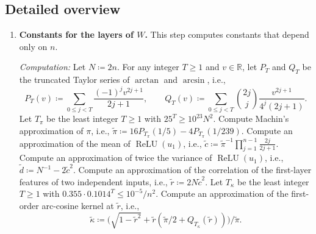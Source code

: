 \documentclass[10pt]{article}
\newcommand{\RR}{\mathbb{R}}
\newcommand{\relu}{\operatorname{ReLU}}
\begin{document}
\subsection{Detailed overview}
\begin{enumerate}[leftmargin=*,itemsep=8pt,topsep=10pt plus 2pt]
\item \textbf{Constants for the layers of $W$.} This step computes
  constants that depend only on $n$.

  \emph{Computation:} Let $N\coloneqq 2n$. For any integer $T\ge1$ and
  $v\in\RR$, let $P_T$ and $Q_T$ be the truncated Taylor series of $\arctan$
  and $\arcsin$, i.e.,
  \[P_T(v)\coloneqq \sum_{0\le j<T}\frac{(-1)^jv^{2j+1}}{2j+1},\qquad
  Q_T(v)\coloneqq \sum_{0\le j<T}\binom{2j}{j}\frac{v^{2j+1}}{4^j(2j+1)}.\]
  Let $T_\pi$ be the least integer $T\ge1$ with $25^T\ge10^{23}N^2$.
  Compute Machin's approximation of $\pi$, i.e.,
  $\tilde\pi\coloneqq 16P_{T_\pi}(1/5)-4P_{T_\pi}(1/239)$. Compute an
  approximation of the mean of $\relu(u_1)$, i.e.,
  $\tilde c\coloneqq \tilde\pi^{-1}\prod_{j=1}^{n-1}\frac{2j}{2j+1}$. Compute
  an approximation of twice the variance of $\relu(u_1)$, i.e.,
  $\tilde d\coloneqq N^{-1}-2\tilde c^2$. Compute an approximation of the correlation of the
  first-layer features of two independent inputs, i.e.,
  $\tilde r\coloneqq 2N\tilde c^2$. Let $T_\kappa$ be the least integer
  $T\ge1$ with $0.355\cdot0.1014^T\le10^{-5}/n^2$. Compute an approximation
  of the first-order arc-cosine kernel at $\tilde r$, i.e.,
  \[\tilde\kappa\coloneqq \bigl(\sqrt{1-\tilde r^2}+\tilde r(\tilde\pi/2+Q_{T_\kappa}(\tilde r))\bigr)/\tilde\pi.\]


\end{enumerate}
\end{document}
